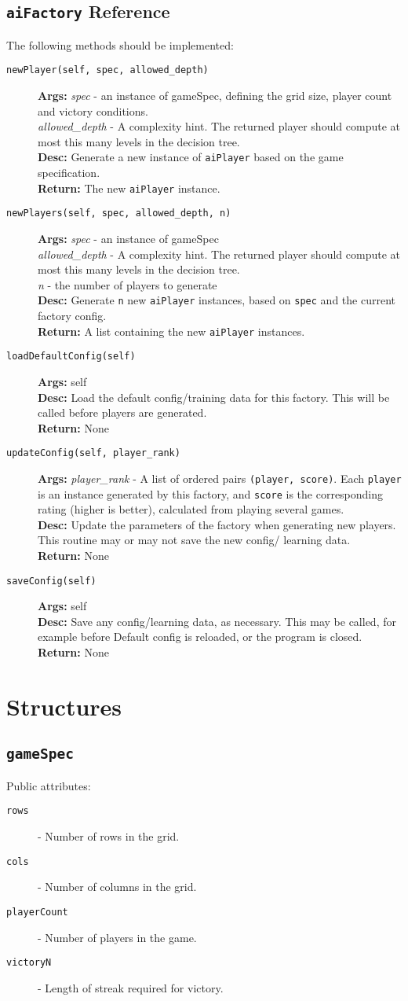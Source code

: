 \documentclass[a4paper,11pt]{article}
\newcommand{\MethodItem}[4]{\item[{\tt #1}]{\bf Args: }#2\\{\bf Desc: }#3\\{\bf Return: }#4}
\newcommand{\MethodArg}[2]{{\it #1} - #2}
\newcommand{\AttrItem}[2]{\item[{\tt #1}] - #2}
\begin{document}
\subsection{{\tt aiFactory} Reference}
The following methods should be implemented:
\begin{description}
\MethodItem{newPlayer(self, spec, allowed\_depth)}{\MethodArg{spec}{an instance of gameSpec, defining the grid size, player count and victory conditions.}\\\MethodArg{allowed\_depth}{A complexity hint. The returned player should compute at most this many levels in the decision tree.}}{Generate a new instance of {\tt aiPlayer} based on the game specification.}{The new {\tt aiPlayer} instance.}
\MethodItem{newPlayers(self, spec, allowed\_depth, n)}{\MethodArg{spec}{an instance of gameSpec}\\\MethodArg{allowed\_depth}{A complexity hint. The returned player should compute at most this many levels in the decision tree.}\\\MethodArg{n}{the number of players to generate}}{Generate {\tt n} new {\tt aiPlayer} instances, based on {\tt spec} and the current factory config.}{A list containing the new {\tt aiPlayer} instances.}

\MethodItem{loadDefaultConfig(self)}{self}{Load the default config/training data for this factory. This will be called before players are generated.}{None}
\MethodItem{updateConfig(self, player\_rank)}{\MethodArg{player\_rank}{A list of ordered pairs {\tt(player, score)}. Each {\tt player} is an instance generated by this factory, and {\tt score} is the corresponding rating (higher is better), calculated from playing several games.}}{Update the parameters of the factory when generating new players. This routine may or may not save the new config/ learning data.}{None}
\MethodItem{saveConfig(self)}{self}{Save any config/learning data, as necessary. This may be called, for example before Default config is reloaded, or the program is closed.}{None}
\end{description}
\section{Structures}
\subsection{\tt gameSpec}
Public attributes:
\begin{description}
\AttrItem{rows}{Number of rows in the grid.}
\AttrItem{cols}{Number of columns in the grid.}
\AttrItem{playerCount}{Number of players in the game.}
\AttrItem{victoryN}{Length of streak required for victory.}
\end{description}
{}
\end{document}
